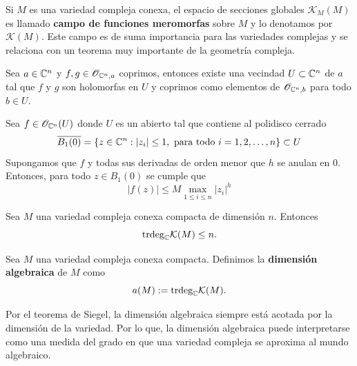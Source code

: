 Si $M$ es una variedad compleja conexa, el espacio de secciones globales $\mathcal{K}_{M}(M)$ es llamado \textbf{campo de funciones meromorfas} sobre $M$ y lo denotamos por $\mathcal{K}(M)$. Este campo es de suma importancia para las variedades complejas y se relaciona con un teorema muy importante de la geometría compleja.

\begin{theorem}
	Sea $a\in\mathbb{C}^n$ y $f,g\in\mathscr{O}_{\mathbb{C}^n,a}$ coprimos, entonces existe una vecindad $U\subset\mathbb{C}^n$ de $a$ tal que $f$ y $g$ son holomorfas en $U$ y coprimos como elementos de $\mathscr{O}_{\mathbb{C}^n,b}$ para todo $b\in U$.
\end{theorem} 

\begin{lemma}
	Sea $f\in\mathscr{O}_{\mathbb{C}^n}(U)$ donde $U$ es un abierto tal que contiene al polidisco cerrado
	\begin{equation*}
		\overline{B_1(0)}=\{z\in\mathbb{C}^n:|z_i|\leq 1,\text{ para todo }i=1,2,\dots,n\}\subset U
	\end{equation*}
	Supongamos que $f$ y todas sus derivadas de orden menor que $h$ se anulan en $0$. Entonces, para todo $z\in B_1(0)$ se cumple que
	\begin{equation*}
		|f(z)|\leq M\max_{1\leq i\leq n}|z_i|^h
	\end{equation*}
\end{lemma}

\begin{theorem}[Siegel]
	Sea $M$ una variedad compleja conexa compacta de dimensión $n$. Entonces
	\begin{equation*}
		\mathrm{trdeg}_{\mathbb{C}} \mathcal{K}(M)\leq n.
	\end{equation*}
\end{theorem}


\begin{definition}
	Sea $M$ una variedad compleja conexa compacta. Definimos la \textbf{dimensión algebraica} de $M$ como
	\begin{equation*}
		a(M):=\mathrm{trdeg}_{\mathbb{C}}\mathcal{K}(M).
	\end{equation*}
\end{definition}

Por el teorema de Siegel, la dimensión algebraica siempre está acotada por la dimensión de la variedad. Por lo que, la dimensión algebraica puede interpretarse como una medida del grado en que una variedad compleja se aproxima al mundo algebraico.

